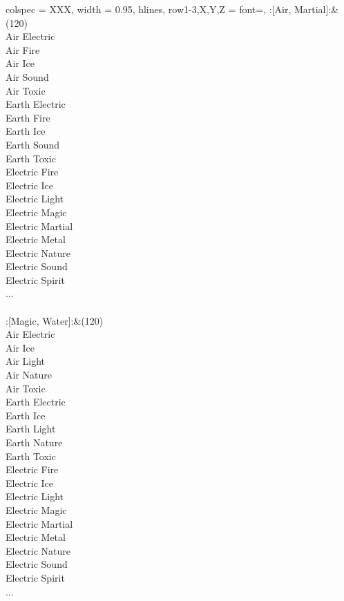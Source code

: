 \begin{longtblr}[
	caption = {2v2 Defending Weak},
	label = {2v2-Defending-Weak},
]{
	colspec = {XXX}, width = 0.95\linewidth,
	hlines,
	row{1-3,X,Y,Z} = {font=\bfseries},
}
	:[Air, Martial]:&{(120)\\
	Air Electric \\
	Air Fire \\
	Air Ice \\
	Air Sound \\
	Air Toxic \\
	Earth Electric \\
	Earth Fire \\
	Earth Ice \\
	Earth Sound \\
	Earth Toxic \\
	Electric Fire \\
	Electric Ice \\
	Electric Light \\
	Electric Magic \\
	Electric Martial \\
	Electric Metal \\
	Electric Nature \\
	Electric Sound \\
	Electric Spirit \\
	...\\
	}\\

	:[Magic, Water]:&{(120)\\
	Air Electric \\
	Air Ice \\
	Air Light \\
	Air Nature \\
	Air Toxic \\
	Earth Electric \\
	Earth Ice \\
	Earth Light \\
	Earth Nature \\
	Earth Toxic \\
	Electric Fire \\
	Electric Ice \\
	Electric Light \\
	Electric Magic \\
	Electric Martial \\
	Electric Metal \\
	Electric Nature \\
	Electric Sound \\
	Electric Spirit \\
	...\\
	}\\


\end{longtblr}
